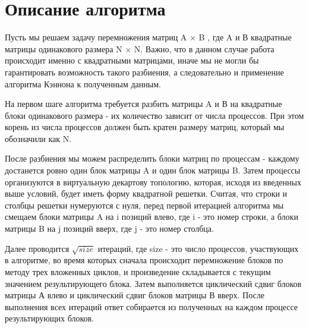 \documentclass{report}
\begin{document}
\section*{Описание алгоритма}
\par Пусть мы решаем задачу перемножения матриц A $ \times $ B , где A и В квадратные матрицы одинакового размера N $\times $ N. Важно, что в данном случае работа происходит именно с квадратными матрицами, иначе мы не могли бы гарантировать возможность такого разбиения, а следовательно и применение алгоритма Кэннона к полученным данным. 
\par На первом шаге алгоритма требуется разбить матрицы A и В на квадратные блоки одинакового размера - их количество зависит от числа процессов. При этом корень из числа процессов должен быть кратен размеру матриц, который мы обозначили как N.
\par После разбиения мы можем распределить блоки матриц по процессам - каждому достанется ровно один блок матрицы A и один блок матрицы B. Затем процессы организуются в виртуальную декартову топологию, которая, исходя из введенных выше условий, будет иметь форму квадратной решетки. Считая, что строки и столбцы решетки нумеруются с нуля, перед первой итерацией алгоритма мы смещаем блоки матрицы A на i позиций влево, где i - это номер строки, а блоки матрицы B на j позиций вверх, где j - это номер столбца.
\par Далее проводится $ \sqrt{size} $ итераций, где size - это число процессов, участвующих в алгоритме, во время которых сначала происходит перемножение блоков по методу трех вложенных циклов, и произведение складывается с текущим значением результирующего блока. Затем выполняется циклический сдвиг блоков матрицы А влево и циклический сдвиг блоков матрицы В вверх. После выполнения всех итераций ответ собирается из полученных на каждом процессе результирующих блоков.

\newpage

\end{document}
